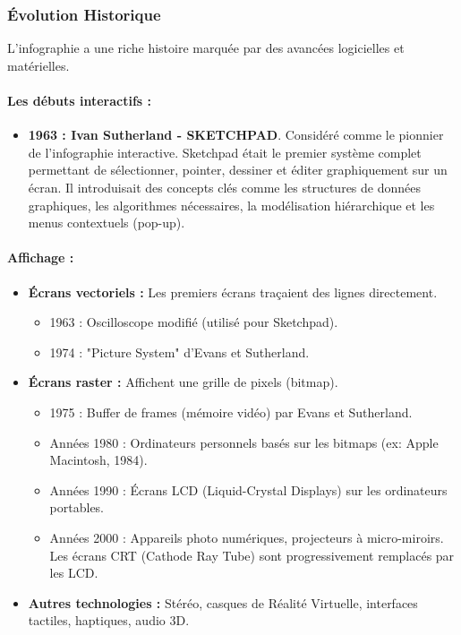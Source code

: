 \documentclass{article}
\begin{document}
\subsubsection{Évolution Historique}

L'infographie a une riche histoire marquée par des avancées logicielles et matérielles.

\paragraph{Les débuts interactifs :}
\begin{itemize}
    \item \textbf{1963 : Ivan Sutherland - SKETCHPAD}. Considéré comme le pionnier de l'infographie interactive. Sketchpad était le premier système complet permettant de sélectionner, pointer, dessiner et éditer graphiquement sur un écran. Il introduisait des concepts clés comme les structures de données graphiques, les algorithmes nécessaires, la modélisation hiérarchique et les menus contextuels (pop-up).
\end{itemize}

\paragraph{Affichage :}
\begin{itemize}
    \item \textbf{Écrans vectoriels :} Les premiers écrans traçaient des lignes directement.
    \begin{itemize}
        \item 1963 : Oscilloscope modifié (utilisé pour Sketchpad).
        \item 1974 : "Picture System" d'Evans et Sutherland.
    \end{itemize}
    \item \textbf{Écrans raster :} Affichent une grille de pixels (bitmap).
    \begin{itemize}
        \item 1975 : Buffer de frames (mémoire vidéo) par Evans et Sutherland.
        \item Années 1980 : Ordinateurs personnels basés sur les bitmaps (ex: Apple Macintosh, 1984).
        \item Années 1990 : Écrans LCD (Liquid-Crystal Displays) sur les ordinateurs portables.
        \item Années 2000 : Appareils photo numériques, projecteurs à micro-miroirs. Les écrans CRT (Cathode Ray Tube) sont progressivement remplacés par les LCD.
    \end{itemize}
    \item \textbf{Autres technologies :} Stéréo, casques de Réalité Virtuelle, interfaces tactiles, haptiques, audio 3D.
\end{itemize}
\end{document}
